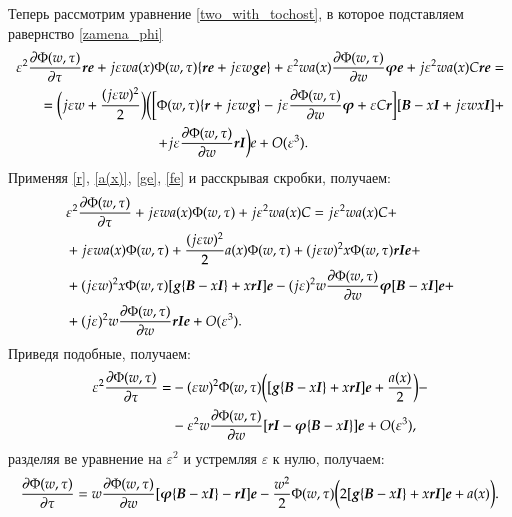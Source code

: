 Теперь рассмотрим уравнение \eqref{two_with_tochost}, в которое подставляем равернство \eqref{zamena_phi}
\begin{align*}
	\varepsilon^2 \pdv{\Phi (w, \tau)}{\tau}\boldsymbol{re}+	j \varepsilon w a(x) \Phi (w, \tau)\{\boldsymbol{re} + j \varepsilon w \boldsymbol{ge}\}
    + \varepsilon^2 w a(x)\pdv{\Phi (w, \tau)}{w} \boldsymbol{\varphi e}+ j\varepsilon^2 w a(x)C\boldsymbol{re} =\\
	=\bigg(j\varepsilon w+\frac{(j\varepsilon w)^2}{2}\bigg)\bigg(\bigg[\Phi (w,\tau)\{\boldsymbol{r}
    +j\varepsilon w\boldsymbol{g}\}-j\varepsilon \pdv{\Phi (w, \tau)}{w}\boldsymbol{\varphi}  
    +\varepsilon C\boldsymbol{r}\bigg][\boldsymbol{B}-x\boldsymbol{I}+j\varepsilon w x \boldsymbol{I}]+ \\
    +j\varepsilon \pdv{\Phi (w, \tau)}{w}\boldsymbol{rI}\bigg)e +O(\varepsilon^3).\hspace{140pt}
\end{align*}
Применяя \eqref{r}, \eqref{a(x)}, \eqref{ge}, \eqref{fe} и расскрывая скробки, получаем:
\begin{align*}
	&\varepsilon^2 \pdv{\Phi (w, \tau)}{\tau}+j \varepsilon w a(x) \Phi (w, \tau)+ j\varepsilon^2 w a(x)C = j\varepsilon^2 w a(x)C+\\
	&+j \varepsilon w a(x) \Phi (w, \tau)+\frac{(j \varepsilon w)^2}{2} a(x) \Phi (w, \tau) + (j \varepsilon w)^2 x \Phi (w, \tau)\boldsymbol{rIe}+\\
	&+(j \varepsilon w)^2 x \Phi (w, \tau)[\boldsymbol{g}\{\boldsymbol{B}-x\boldsymbol{I}\}+x\boldsymbol{rI}]\boldsymbol{e}- (j \varepsilon)^2w \pdv{\Phi (w, \tau)}{w}\boldsymbol{\varphi}[\boldsymbol{B}-x\boldsymbol{I}]\boldsymbol{e}+\\
	&+(j \varepsilon)^2w \pdv{\Phi (w, \tau)}{w}\boldsymbol{rIe}+O(\varepsilon^3).
\end{align*}
Приведя подобные, получаем:
\begin{align*}
	\varepsilon^2\pdv{\Phi (w, \tau)}{\tau} = &- (\varepsilon w)^2 \Phi (w, \tau)
        \bigg([\boldsymbol{g}\{\boldsymbol{B}-x\boldsymbol{I}\}+x\boldsymbol{rI}]\boldsymbol{e}+\frac{a(x)}{2}\bigg)-\\
	&- \varepsilon^2w \pdv{\Phi (w, \tau)}{w}[\boldsymbol{rI} -\boldsymbol{\varphi}\{\boldsymbol{B}-x\boldsymbol{I}\}]\boldsymbol{e}+O(\varepsilon^3),
\end{align*}
разделяя ве уравнение на $\varepsilon^2$ и устремляя $\varepsilon$ к нулю, получаем:
\begin{align*}
	\pdv{\Phi (w, \tau)}{\tau} =w\pdv{\Phi (w, \tau)}{w}[\boldsymbol{\varphi}\{\boldsymbol{B}-x\boldsymbol{I}\}-\boldsymbol{rI}]\boldsymbol{e}- \frac{w^2}{2}\Phi (w, \tau)
        \bigg(2[\boldsymbol{g}\{\boldsymbol{B}-x\boldsymbol{I}\}+x\boldsymbol{rI}]\boldsymbol{e}+ a(x)\bigg).
\end{align*}
